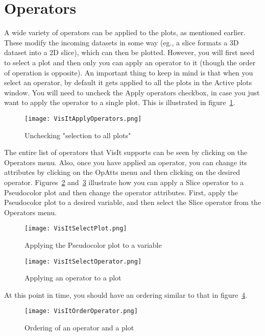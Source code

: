 \section{Operators}

A wide variety of operators can be applied to the plots, as mentioned earlier. These modify the incoming datasets in some way (eg., a slice formats a 3D dataset into a 2D slice), which can then be plotted. However, you will first need to select a plot and then only you can apply an operator to it (though the order of operation is opposite). An important thing to keep in mind is that when you select an operator, by default it gets applied to all the plots in the Active plots window. You will need to uncheck the Apply operators checkbox, in case you just want to apply the operator to a single plot. This is illustrated in figure~\ref{VisItApplyOperators}.

\begin{figure}
  \center
  \texttt{[image: VisItApplyOperators.png]}
  \caption{Unchecking "selection to all plots"}
  \label{VisItApplyOperators}
\end{figure}

The entire list of operators that VisIt supports can be seen by clicking on the Operators menu. Also, once you have applied an operator, you can change its attributes by clicking on the OpAtts menu and then clicking on the desired operator.
Figures~\ref{VisItSelectPlot} and~\ref{VisItSelectOperator} illustrate how you can apply a Slice operator to a Pseudocolor plot and then change the operator attributes.
First, apply the Pseudocolor plot to a desired variable, and then select the Slice operator from the Operators menu.

\begin{figure}
  \center
  \texttt{[image: VisItSelectPlot.png]}
  \caption{Applying the Pseudocolor plot to a variable}
  \label{VisItSelectPlot}
\end{figure}

\begin{figure}
  \center
  \texttt{[image: VisItSelectOperator.png]}
  \caption{Applying an operator to a plot}
  \label{VisItSelectOperator}
\end{figure}

At this point in time, you should have an ordering similar to that in figure~\ref{VisItOrderOperator}.  

\begin{figure}
  \center
  \texttt{[image: VisItOrderOperator.png]}
  \caption{Ordering of an operator and a plot}
  \label{VisItOrderOperator}
\end{figure}

